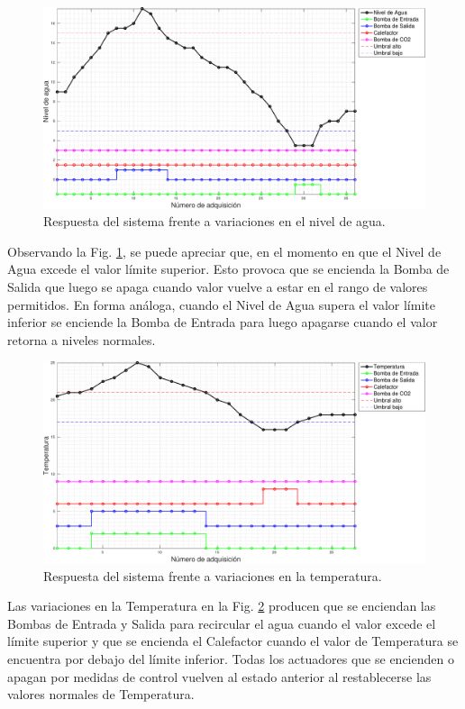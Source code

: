\begin{figure}[h]
\centering
    \includegraphics[width=\textwidth]{./Figures/plot1Water.pdf}
	\caption{Respuesta del sistema frente a variaciones en el nivel de agua.}
	\label{fig:alarma1Nivel}
\end{figure}

Observando la Fig. \ref{fig:alarma1Nivel}, se puede apreciar que, en el momento en que el Nivel de Agua excede el valor límite superior. Esto provoca que se encienda la Bomba de Salida que luego se apaga cuando valor vuelve a estar en el rango de valores permitidos.  En forma análoga, cuando el Nivel de Agua supera el valor límite inferior se enciende la Bomba de Entrada para luego apagarse cuando el valor retorna a niveles normales.

\begin{figure}[h]
\centering
    \includegraphics[width=\textwidth]{./Figures/plot1Temp.pdf}
	\caption{Respuesta del sistema frente a variaciones en la temperatura.}
	\label{fig:alarma1Temp}
\end{figure}

Las variaciones en la Temperatura en la Fig. \ref{fig:alarma1Temp} producen que se enciendan las Bombas de Entrada y Salida para recircular el agua cuando el valor excede el límite superior y que se encienda el Calefactor cuando el valor de Temperatura se encuentra por debajo del límite inferior.  Todas los actuadores que se encienden o apagan por medidas de control vuelven al estado anterior al restablecerse las valores normales de Temperatura.


